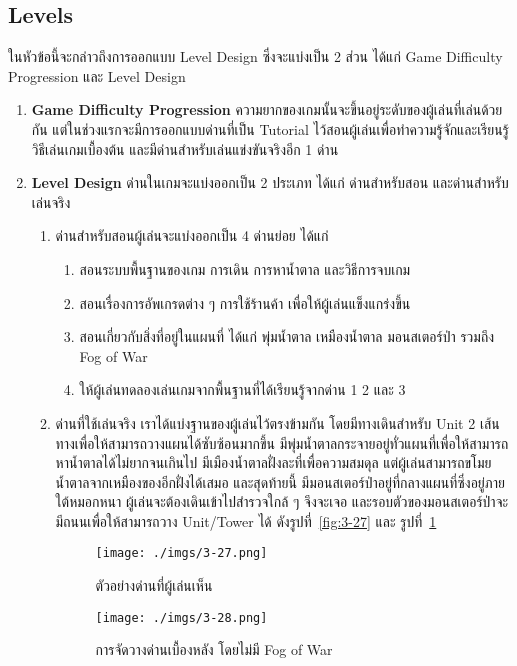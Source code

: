 \documentclass[12pt,oneside,openright,a4paper]{cpe-thai-project}
\begin{document}
\subsection{Levels}
ในหัวข้อนี้จะกล่าวถึงการออกแบบ Level Design ซึ่งจะแบ่งเป็น 2 ส่วน 
ได้แก่ Game Difficulty Progression และ Level Design
\begin{enumerate}
  \item \textbf{Game Difficulty Progression}
  ความยากของเกมนั้นจะขึ้นอยู่ระดับของผู้เล่นที่เล่นด้วยกัน แต่ในช่วงแรกจะมีการออกแบบด่านที่เป็น 
  Tutorial ไว้สอนผู้เล่นเพื่อทำความรู้จักและเรียนรู้วิธีเล่นเกมเบื้องต้น 
  และมีด่านสำหรับเล่นแข่งขันจริงอีก 1 ด่าน

  \item \textbf{Level Design}
  ด่านในเกมจะแบ่งออกเป็น 2 ประเภท ได้แก่ ด่านสำหรับสอน และด่านสำหรับเล่นจริง
  \begin{enumerate}
    \item ด่านสำหรับสอนผู้เล่นจะแบ่งออกเป็น 4 ด่านย่อย ได้แก่
    \begin{enumerate}
      \item สอนระบบพื้นฐานของเกม การเดิน การหาน้ำตาล และวิธีการจบเกม
      \item สอนเรื่องการอัพเกรดต่าง ๆ การใช้ร้านค้า เพื่อให้ผู้เล่นแข็งแกร่งขึ้น
      \item สอนเกี่ยวกับสิ่งที่อยู่ในแผนที่ ได้แก่ พุ่มน้ำตาล เหมืองน้ำตาล มอนสเตอร์ป่า รวมถึง Fog of War
      \item ให้ผู้เล่นทดลองเล่นเกมจากพื้นฐานที่ได้เรียนรู้จากด่าน 1 2 และ 3
    \end{enumerate}

    \item ด่านที่ใช้เล่นจริง เราได้แบ่งฐานของผู้เล่นไว้ตรงข้ามกัน 
    โดยมีทางเดินสำหรับ Unit 2 เส้นทางเพื่อให้สามารถวางแผนได้ซับซ้อนมากขึ้น 
    มีพุ่มน้ำตาลกระจายอยู่ทั่วแผนที่เพื่อให้สามารถหาน้ำตาลได้ไม่ยากจนเกินไป 
    มีเมืองน้ำตาลฝั่งละที่เพื่อความสมดุล แต่ผู้เล่นสามารถขโมยน้ำตาลจากเหมืองของอีกฝั่งได้เสมอ 
    และสุดท้ายนี้ มีมอนสเตอร์ป่าอยู่ที่กลางแผนที่ซึ่งอยู่ภายใต้หมอกหนา 
    ผู้เล่นจะต้องเดินเข้าไปสำรวจใกล้ ๆ จึงจะเจอ 
    และรอบตัวของมอนสเตอร์ป่าจะมีถนนเพื่อให้สามารถวาง Unit/Tower ได้ ดังรูปที่~\ref{fig:3-27} และ รูปที่~\ref{fig:3-28}

    \begin{figure}[H]\centering
      \begin{minipage}{.45\textwidth}
        \centering
        \texttt{[image: ./imgs/3-27.png]}
        \caption{ตัวอย่างด่านที่ผู้เล่นเห็น}\label{fig:3-27}
      \end{minipage}
      \begin{minipage}{.45\textwidth}
        \centering
        \texttt{[image: ./imgs/3-28.png]}
        \caption{การจัดวางด่านเบื้องหลัง โดยไม่มี Fog of War}\label{fig:3-28}
      \end{minipage}
    \end{figure}
  \end{enumerate}
\end{enumerate}
\end{document}
